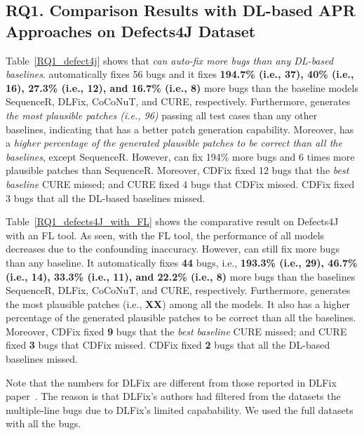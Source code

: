 \subsection{\bf RQ1. Comparison Results with DL-based APR Approaches on Defects4J Dataset}

Table~\ref{RQ1_defect4j} shows that {\em {\tool} can auto-fix more bugs
than any DL-based baselines}. {\tool}
automatically fixes 56 bugs and it fixes {\bf 194.7\% (i.e., 37), 40\%
(i.e., 16), 27.3\% (i.e., 12), and 16.7\% (i.e., 8)} more bugs than the
baseline models SequenceR, DLFix, CoCoNuT, and CURE,
respectively.
Furthermore, {\tool} generates {\em the most plausible
patches (i.e., 96)} passing all test cases than any other baselines,
indicating that {\tool} has a better patch generation
capability. Moreover, {\tool} has a {\em higher percentage of the generated
plausible patches to be correct than all the baselines}, except
SequenceR. However, {\tool} can fix 194\% more bugs and 6 times more
plausible patches than SequenceR.
%
Moreover, CDFix fixed 12 bugs that the {\em best baseline} CURE
missed; and CURE fixed 4 bugs that CDFix missed. CDFix fixed 3 bugs
that all the DL-based baselines missed.

Table~\ref{RQ1_defects4J_with_FL} shows the comparative result on
Defects4J with an FL tool. As seen, with the FL tool, the performance
of all models decreases due to the confounding inaccuracy. However,
{\tool} can still fix more bugs than any baseline. It
automatically fixes {\bf 44} bugs, i.e., {\bf 193.3\% (i.e., 29), 46.7\%
  (i.e., 14), 33.3\% (i.e., 11), and 22.2\% (i.e., 8)} more bugs than
the baselines SequenceR, DLFix, CoCoNuT, and CURE,
respectively.
Furthermore, {\tool} generates the most plausible patches (i.e., {\bf
  XX}) among all the models.
It also has a higher percentage of the generated plausible patches to
be correct than all the baselines.
Moreover, CDFix fixed {\bf 9} bugs that the {\em best baseline} CURE
missed; and CURE fixed {\bf 3} bugs that CDFix missed. CDFix fixed
{\bf 2} bugs that all the DL-based baselines missed.

Note that the numbers for DLFix are different from those
reported in DLFix paper~\cite{icse20}. The reason is that DLFix's
authors had filtered from the datasets the multiple-line bugs due to
DLFix's limited capabability. We used the full datasets with all the
bugs.

